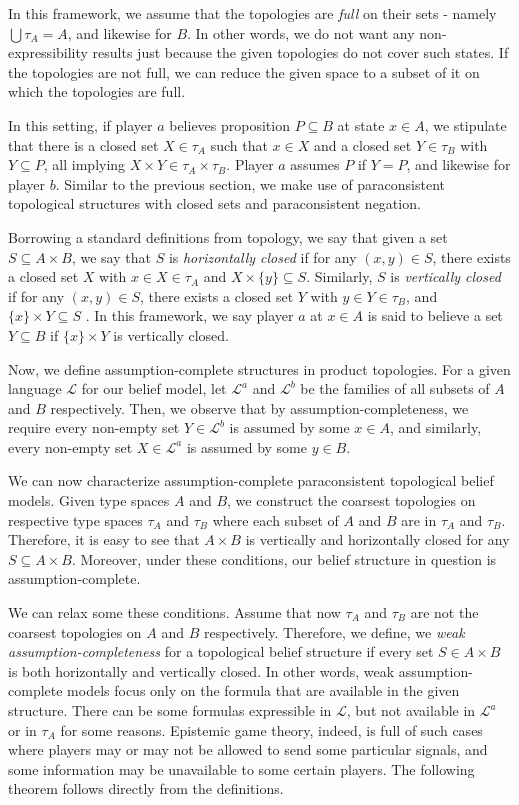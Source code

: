 \documentclass{article}
\begin{document}
In this framework, we assume that the topologies are \emph{full} on their sets - namely $\bigcup \tau_A = A$, and likewise for $B$. In other words, we do not want any non-expressibility results just because the given topologies do not cover such states. If the topologies are not full, we can reduce the given space to a subset of it on which the topologies are full.

In this setting, if player $a$ believes proposition $P \subseteq B$ at state $x \in A$, we stipulate that there is a closed set $X \in \tau_A$ such that $x \in X$ and a closed set $Y \in \tau_B$ with $Y \subseteq P$, all implying $X \times Y \in \tau_A \times \tau_B$. Player $a$ assumes $P$ if $Y = P$, and likewise for player $b$. Similar to the previous section, we make use of paraconsistent topological structures with closed sets and paraconsistent negation.

Borrowing a standard definitions from topology, we say that given a set $S \subseteq A \times B$, we say that $S$ is \emph{horizontally closed} if for any $(x, y) \in S$, there exists a closed set $X$ with $x \in X \in \tau_A$ and $X \times \{ y \} \subseteq S$. Similarly, $S$ is \emph{vertically closed} if for any $(x, y) \in S$, there exists a closed set $Y$ with $y \in Y \in \tau_B$, and $\{ x \} \times Y \subseteq S$  \cite{ben1,ben3}. In this framework, we say player $a$ at $x \in A$ is said to believe a set $Y \subseteq B$ if $\{ x \} \times Y$ is vertically closed. 

Now, we define assumption-complete structures in product topologies. For a given language $\mathcal{L}$ for our belief model, let $\mathcal{L}^a$ and $\mathcal{L}^b$ be the families of all subsets of $A$ and $B$ respectively. Then, we observe that by assumption-completeness, we require every non-empty set $Y \in \mathcal{L}^b$ is assumed by some $x \in A$, and similarly, every non-empty set $X \in \mathcal{L}^a$ is assumed by some $y \in B$.
 
We can now characterize assumption-complete paraconsistent topological belief models. Given type spaces $A$ and $B$, we construct the coarsest topologies on respective type spaces $\tau_A$ and $\tau_B$ where each subset of $A$ and $B$ are in $\tau_A$ and $\tau_B$. Therefore, it is easy to see that $A \times B$ is vertically and horizontally closed for any $S \subseteq A \times B$. Moreover, under these conditions, our belief structure in question is assumption-complete. 

We can relax some these conditions. Assume that now $\tau_A$ and $\tau_B$ are not the coarsest topologies on $A$ and $B$ respectively. Therefore, we define, we \emph{weak assumption-completeness} for a topological belief structure if every set $S \in A \times B$ is both horizontally and vertically closed. In other words, weak assumption-complete models focus only on the formula that are available in the given structure. There can be some formulas expressible in $\mathcal{L}$, but not available in $\mathcal{L}^a$ or in $\tau_A$ for some reasons. Epistemic game theory, indeed, is full of such cases where players may or may not be allowed to send some particular signals, and some information may be unavailable to some certain players. The following theorem follows directly from the definitions.
\end{document}
